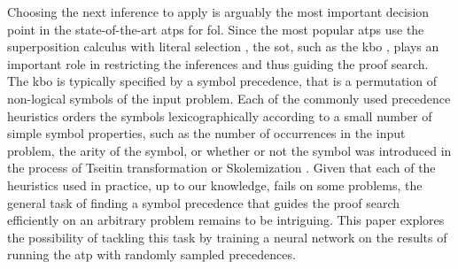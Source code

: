


\iffalse

Choosing the next inference to apply is arguably the most important decision point in the state-of-the-art
\glspl{atp} for \gls{fol}.
Since the most popular \glspl{atp} use the superposition calculus with literal selection \cite{DBLP:journals/logcom/BachmairG94},
the \gls{sot}, such as the \gls{kbo} \cite{Knuth1983},
plays an important role in restricting the inferences and thus guiding the proof search.
The \gls{kbo} is typically specified by a symbol precedence,
that is a permutation of non-logical symbols of the input problem.
Each of the commonly used precedence heuristics orders the symbols
lexicographically according to a small number of simple
symbol properties,
such as the number of occurrences in the input problem,
the arity of the symbol, or
whether or not the symbol was introduced in the process of Tseitin transformation \cite{Tseitin1983} or Skolemization \cite{Harrison2009}.
Given that each of the heuristics used in practice, up to our knowledge, fails on some problems,
the general task of
finding a symbol precedence that guides the proof search efficiently on an arbitrary problem
remains to be intriguing.
This paper explores the possibility of tackling this task by training a neural network
on the results of running the \gls{atp} \Vampire{} \cite{10.1007/978-3-642-39799-8_1} with randomly sampled precedences.


